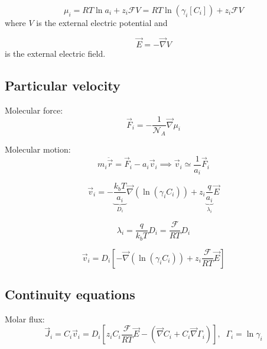 \documentclass[aps,12pt]{revtex4}
\begin{document}
\begin{equation}
	\mu_i = RT \ln a_i + z_i \mathcal{F} V = RT \ln (\gamma_i[C_i]) + z_i \mathcal{F} V
\end{equation}
where $V$ is the external electric potential and

\begin{equation}
	\vec{E} = -\vec{\nabla} V
\end{equation}
is the external electric field.

\subsection{Particular velocity}
Molecular force:	
\begin{equation}
	\vec{F}_i = - \frac{1}{\mathcal{N}_A} \vec{\nabla} \mu_i
\end{equation}

Molecular motion:
\begin{equation}
	m_i \ddot {\vec{r}} = \vec{F}_i - a_i \vec{v}_i \implies \vec{v}_i \simeq \dfrac{1}{a_i} \vec{F}_i
\end{equation}

\begin{equation}
	\vec{v}_i = -\underbrace{\dfrac{k_bT}{a_i}}_{D_i} \vec{\nabla}(\ln(\gamma_i C_i))  + z_i \underbrace{\dfrac{ q}{a_i}}_{\lambda_i} \vec{E}
\end{equation}

\begin{equation}
	\lambda_i = \frac{q}{k_bT} D_i = \dfrac{\mathcal{F}}{RT} D_i
\end{equation}

\begin{equation}
\boxed{
	\vec{v}_i = D_i \left[ - \vec{\nabla}(\ln(\gamma_i C_i)) + z_i \dfrac{\mathcal{F}}{RT} \vec{E} \right]
}
\end{equation}

\subsection{Continuity equations}

Molar flux:
\begin{equation}
	\vec{J}_i = C_i \vec{v}_i = D_i \left[z_i C_i  \dfrac{\mathcal{F}}{RT} \vec{E} - \left(\vec{\nabla} C_i + C_i \vec{\nabla}\Gamma_i\right) \right],\;\;\Gamma_i = \ln \gamma_i
\end{equation}
\end{document}
